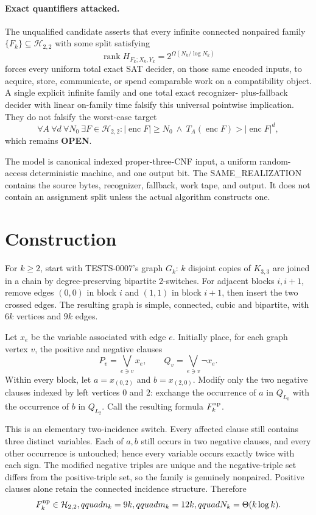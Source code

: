 \documentclass[11pt]{article}
\newcommand{\Htwo}{\mathcal H_{2,2}}
\newcommand{\OPEN}{\textbf{OPEN}}
\begin{document}
\paragraph{Exact quantifiers attacked.}
The unqualified candidate asserts that every infinite connected nonpaired
family $\{F_k\}\subseteq\Htwo$ with some split satisfying
\[
 \operatorname{rank}H_{F_k;X_k,Y_k}
   =2^{\Omega(N_k/\log N_k)}
\]
forces every uniform total exact SAT decider, on those same encoded inputs,
to acquire, store, communicate, or spend comparable work on a compatibility
object.  A single explicit infinite family and one total exact recognizer-
plus-fallback decider with linear on-family time falsify this universal
pointwise implication.  They do not falsify the worst-case target
\[
\tag{UCORE-TIME1}
 \forall A\ \forall d\ \forall N_0\ \exists F\in\Htwo:
 |\operatorname{enc}F|\ge N_0\ \land\
 T_A(\operatorname{enc}F)>|\operatorname{enc}F|^d,
\]
which remains \OPEN.

The model is canonical indexed proper-three-CNF input, a uniform
random-access deterministic machine, and one output bit.  The
SAME\_REALIZATION contains the source bytes, recognizer, fallback, work
tape, and output.  It does not contain an assignment split unless the actual
algorithm constructs one.

\section{Construction}

For $k\ge2$, start with TESTS-0007's graph $G_k$: $k$ disjoint copies of
$K_{3,3}$ are joined in a chain by degree-preserving bipartite 2-switches.
For adjacent blocks $i,i+1$, remove edges $(0,0)$ in block $i$ and $(1,1)$
in block $i+1$, then insert the two crossed edges.  The resulting graph is
simple, connected, cubic and bipartite, with $6k$ vertices and $9k$ edges.

Let $x_e$ be the variable associated with edge $e$.  Initially place, for
each graph vertex $v$, the positive and negative clauses
\[
 P_v=\bigvee_{e\ni v}x_e,
 \qquad
 Q_v=\bigvee_{e\ni v}\neg x_e.
\]
Within every block, let $a=x_{(0,2)}$ and $b=x_{(2,0)}$.  Modify only the
two negative clauses indexed by left vertices $0$ and $2$: exchange the
occurrence of $a$ in $Q_{L_0}$ with the occurrence of $b$ in $Q_{L_2}$.
Call the resulting formula $F_k^{\rm np}$.

This is an elementary two-incidence switch.  Every affected clause still
contains three distinct variables.  Each of $a,b$ still occurs in two
negative clauses, and every other occurrence is untouched; hence every
variable occurs exactly twice with each sign.  The modified negative triples
are unique and the negative-triple set differs from the positive-triple set,
so the family is genuinely nonpaired.  Positive clauses alone retain the
connected incidence structure.  Therefore
\[
 F_k^{\rm np}\in\Htwo,qquad
 n_k=9k,qquad m_k=12k,qquad
 N_k=\Theta(k\log k).
\]
\end{document}
